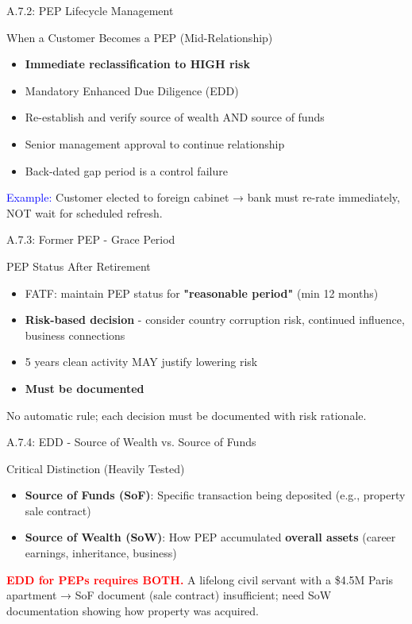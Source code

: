 \documentclass{beamer}
\begin{document}
	\begin{frame}{A.7.2: PEP Lifecycle Management}
		\begin{block}{When a Customer Becomes a PEP (Mid-Relationship)}
			\begin{itemize}
				\item \textbf{Immediate reclassification to HIGH risk}
				\item Mandatory Enhanced Due Diligence (EDD)
				\item Re-establish and verify source of wealth AND source of funds
				\item Senior management approval to continue relationship
				\item Back-dated gap period is a control failure
			\end{itemize}
		\end{block}
		\textcolor{blue}{Example:} Customer elected to foreign cabinet → bank must re-rate immediately, NOT wait for scheduled refresh.
	\end{frame}
	
	\begin{frame}{A.7.3: Former PEP - Grace Period}
		\begin{block}{PEP Status After Retirement}
			\begin{itemize}
				\item FATF: maintain PEP status for \textbf{"reasonable period"} (min 12 months)
				\item \textbf{Risk-based decision} - consider country corruption risk, continued influence, business connections
				\item 5 years clean activity MAY justify lowering risk
				\item \textbf{Must be documented}
			\end{itemize}
		\end{block}
		\textcolor{red}{\textbf{}} No automatic rule; each decision must be documented with risk rationale.
	\end{frame}
	
	\begin{frame}{A.7.4: EDD - Source of Wealth vs. Source of Funds}
		\begin{block}{Critical Distinction (Heavily Tested)}
			\begin{itemize}
				\item \textbf{Source of Funds (SoF)}: Specific transaction being deposited (e.g., property sale contract)
				\item \textbf{Source of Wealth (SoW)}: How PEP accumulated \textbf{overall assets} (career earnings, inheritance, business)
			\end{itemize}
		\end{block}
		\textcolor{red}{\textbf{ EDD for PEPs requires BOTH.}} A lifelong civil servant with a \$4.5M Paris apartment → SoF document (sale contract) insufficient; need SoW documentation showing how property was acquired.
	\end{frame}
	
\end{document}
